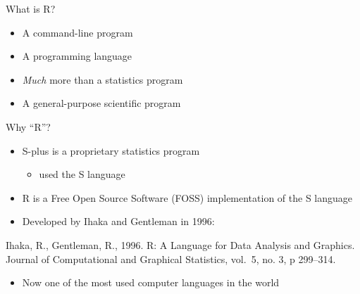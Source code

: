 \documentclass[
  ignorenonframetext,
  aspectratio=169]{beamer}
\providecommand{\tightlist}{%
  \setlength{\itemsep}{0pt}\setlength{\parskip}{0pt}}
\begin{document}
\begin{frame}{What is R?}
\protect\hypertarget{what-is-r}{}
\begin{itemize}
\tightlist
\item
  A command-line program
\item
  A programming language
\item
  \emph{Much} more than a statistics program
\item
  A general-purpose scientific program
\end{itemize}
\end{frame}

\begin{frame}{Why ``R''?}
\protect\hypertarget{why-r}{}
\begin{itemize}
\tightlist
\item
  S-plus is a proprietary statistics program

  \begin{itemize}
  \tightlist
  \item
    used the S language
  \end{itemize}
\item
  R is a Free Open Source Software (FOSS) implementation of the S
  language
\item
  Developed by Ihaka and Gentleman in 1996:
\end{itemize}

Ihaka, R., Gentleman, R., 1996. R: A Language for Data Analysis and
Graphics. Journal of Computational and Graphical Statistics, vol.~5, no.
3, p 299--314.

\begin{itemize}
\tightlist
\item
  Now one of the most used computer languages in the world
\end{itemize}
\end{frame}
\end{document}
